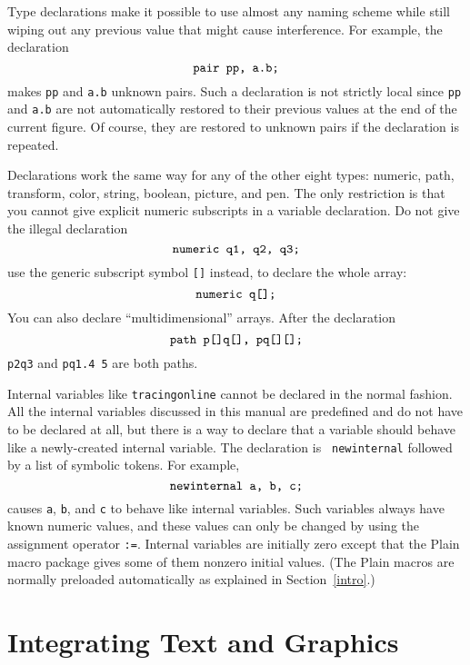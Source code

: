 \documentclass{article} %
\begin{document}
Type declarations
make it possible to use almost any naming scheme while still
wiping out any previous value that might cause interference.  For example, the
declaration
$$ \hbox{\tt pair pp, a.b;} $$
makes {\tt pp} and {\tt a.b} unknown pairs.  Such a declaration is not
strictly local since {\tt pp} and {\tt a.b} are not automatically
restored to their previous values at the end of the current figure.  Of
course, they are restored to unknown pairs if the declaration is
repeated.

Declarations work the same way for any of the other eight types:
numeric, path, transform, color, string, boolean, picture, and pen.  The
only restriction is that you cannot give explicit numeric subscripts in
a variable declaration.  Do not give the illegal declaration
$$ \hbox{\tt numeric q1, q2, q3;} $$
use the generic subscript symbol {\tt []}
instead, to declare the whole array:
$$ \hbox{\tt numeric q[];} $$
You can also declare ``multidimensional'' arrays.
After the declaration
$$ \hbox{\tt path p[]q[], pq[][];} $$
{\tt p2q3} and {\tt pq1.4 5} are both paths.

Internal variables
like {\tt tracingonline} cannot be declared in the normal fashion.  All
the internal variables discussed in this manual are predefined and do
not have to be declared at all, but there is a way to declare that a
variable should behave like a newly-created internal variable.  The
declaration is {\tt
newinternal}\label{Dnewint}
followed by a list of symbolic tokens.  For example,
$$ \hbox{\tt newinternal a, b, c;} $$
causes {\tt a}, {\tt b}, and {\tt c} to behave like internal variables.
Such variables always have known numeric values, and these values can
only be changed by using the assignment operator
{\tt:=}.  Internal variables are initially zero
except that the Plain macro package gives some of
them nonzero initial values.  (The Plain macros are normally preloaded
automatically as explained in Section~\ref{intro}.)


\section{Integrating Text and Graphics}
\label{text}
\end{document}
